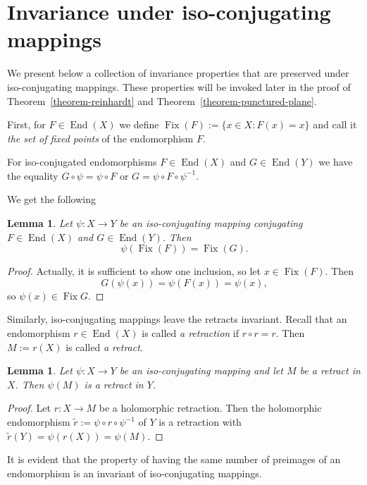 \documentclass[a4paper,12pt]{amsart}
\DeclareMathOperator{\enmo}{End}
\DeclareMathOperator{\Fix}{Fix}
\newtheorem{lemma}[theorem]{Lemma}
\theoremstyle{definition}
\begin{document}
\section{Invariance under iso-conjugating mappings}
We present below a collection of invariance properties that are preserved under iso-conjugating mappings. These properties will be invoked later in the proof of Theorem~\ref{theorem-reinhardt} and Theorem~\ref{theorem-punctured-plane}.

First, for $F\in\enmo(X)$ we define 
\begin{math}
    \Fix(F):=\{x\in X:F(x)=x\}
\end{math} 
and call it {\it the set of fixed points} of the endomorphism $F$.

For iso-conjugated endomorphisms $F\in\enmo(X)$ and $G\in\enmo(Y)$ we have the equality $G\circ\psi=\psi\circ F$ or $G=\psi\circ F\circ \psi^{-1}$.

We get the following 
\begin{lemma}\label{lemma:fixed-points}
    Let $\psi \colon X\to Y$ be an iso-conjugating mapping conjugating  $F\in\enmo(X)$ and $G\in\enmo(Y)$. Then
\begin{equation}
    \psi(\Fix(F))=\Fix(G).
\end{equation}
\end{lemma}
\begin{proof} Actually, it is sufficient to show one inclusion, so let $x\in \Fix(F)$. Then
\begin{equation}
    G(\psi(x))=\psi(F(x))=\psi(x),
\end{equation}
so $\psi(x)\in\Fix G$.
\end{proof}

Similarly, iso-conjugating mappings leave the retracts invariant. Recall that an endomorphism $r\in\enmo(X)$ is called {\it a retraction} if $r\circ r=r$. Then $M:=r(X)$ is called {\it a retract}.

\begin{lemma}
\label{lemma-retract}
Let $\psi \colon X\to Y$ be an iso-conjugating mapping and let $M$ be a retract in $X$. Then $\psi(M)$ is a retract in $Y$.
\end{lemma}
\begin{proof}
    Let $r \colon X\to M$ be a holomorphic retraction. Then the holomorphic endomorphism $\widetilde{r}:=\psi\circ r\circ\psi^{-1}$ of $Y$ is a retraction with $\widetilde{r}(Y)=\psi(r(X))=\psi(M)$.
\end{proof}

It is evident that the property of having the same number of preimages of an endomorphism is an invariant of iso-conjugating mappings.
\end{document}
